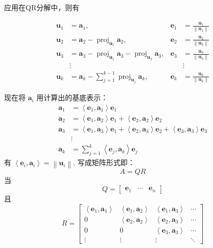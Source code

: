 \documentclass{ctexrep}
\begin{document}
应用在QR分解中，则有

$$
\begin{aligned}
\mathbf{u}_{1} &=\mathbf{a}_{1}, & \mathbf{e}_{1} &=\frac{\mathbf{u}_{1}}{\left\|\mathbf{u}_{1}\right\|} \\
\mathbf{u}_{2} &=\mathbf{a}_{2}-\operatorname{proj}_{\mathbf{u}_{1}} \mathbf{a}_{2}, & \mathbf{e}_{2} &=\frac{\mathbf{u}_{2}}{\left\|\mathbf{u}_{2}\right\|} \\
\mathbf{u}_{3} &=\mathbf{a}_{3}-\operatorname{proj}_{\mathbf{u}_{1}} \mathbf{a}_{3}-\operatorname{proj}_{\mathbf{u}_{2}} \mathbf{a}_{3}, & \mathbf{e}_{3} &=\frac{\mathbf{u}_{3}}{\left\|\mathbf{u}_{3}\right\|} \\
& \vdots & & \vdots \\
\mathbf{u}_{k} &=\mathbf{a}_{k}-\sum_{j=1}^{k-1} \operatorname{proj}_{\mathbf{u}_{j}} \mathbf{a}_{k}, & \mathbf{e}_{k} &=\frac{\mathbf{u}_{k}}{\left\|\mathbf{u}_{k}\right\|}
\end{aligned}
$$


现在将 $\mathbf{a}_{i}$ 用计算出的基底表示：
$$
\begin{aligned}
\mathbf{a}_{1} &=\left\langle\mathbf{e}_{1}, \mathbf{a}_{1}\right\rangle \mathbf{e}_{1} \\
\mathbf{a}_{2} &=\left\langle\mathbf{e}_{1}, \mathbf{a}_{2}\right\rangle \mathbf{e}_{1}+\left\langle\mathbf{e}_{2}, \mathbf{a}_{2}\right\rangle \mathbf{e}_{2} \\
\mathbf{a}_{3} &=\left\langle\mathbf{e}_{1}, \mathbf{a}_{3}\right\rangle \mathbf{e}_{1}+\left\langle\mathbf{e}_{2}, \mathbf{a}_{3}\right\rangle \mathbf{e}_{2}+\left\langle\mathbf{e}_{3}, \mathbf{a}_{3}\right\rangle \mathbf{e}_{3} \\
& \vdots \\
\mathbf{a}_{k} &=\sum_{j=1}^{k}\left\langle\mathbf{e}_{j}, \mathbf{a}_{k}\right\rangle \mathbf{e}_{j}
\end{aligned}
$$
有 $\left\langle\mathbf{e}_{i}, \mathbf{a}_{i}\right\rangle=\left\|\mathbf{u}_{i}\right\| .$ 写成矩阵形式即：
$$
A=Q R
$$
当
$$
Q=\left[\begin{array}{lll}
\mathbf{e}_{1} & \cdots & \mathbf{e}_{n}
\end{array}\right]
$$
且
$$
R=\left[\begin{array}{cccc}
\left\langle\mathbf{e}_{1}, \mathbf{a}_{1}\right\rangle & \left\langle\mathbf{e}_{1}, \mathbf{a}_{2}\right\rangle & \left\langle\mathbf{e}_{1}, \mathbf{a}_{3}\right\rangle & \cdots \\
0 & \left\langle\mathbf{e}_{2}, \mathbf{a}_{2}\right\rangle & \left\langle\mathbf{e}_{2}, \mathbf{a}_{3}\right\rangle & \cdots \\
0 & 0 & \left\langle\mathbf{e}_{3}, \mathbf{a}_{3}\right\rangle & \cdots \\
\vdots & \vdots & \vdots & \ddots
\end{array}\right]
$$
\end{document}

